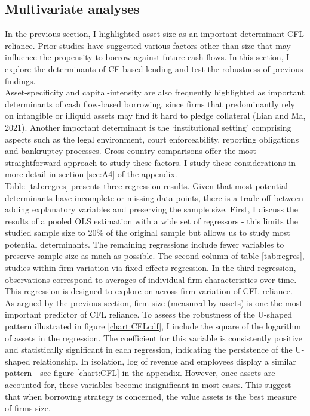 \documentclass[12pt]{article}
\begin{document}
\subsection{Multivariate analyses \label{sec: multivariate analysis}}

In the previous section, I highlighted asset size as an important determinant CFL reliance. Prior studies have suggested various factors other than size that may influence the propensity to borrow against future cash flows. In this section, I explore the determinants of CF-based lending and test the robustness of previous findings. \vspace{3mm} \\
Asset-specificity and capital-intensity are also frequently highlighted as important determinants of cash flow-based borrowing, since firms that predominantly rely on intangible or illiquid assets may find it hard to pledge collateral (Lian and Ma, 2021). Another important determinant is the `institutional setting' comprising aspects such as the legal environment, court enforceability, reporting obligations and bankruptcy processes. Cross-country comparisons offer the most straightforward approach to study these factors. I study these considerations in more detail in section \ref{sec:A4} of the appendix.
 \vspace{3mm} \\
Table \ref{tab:regres} presents three regression results. Given that most potential determinants have incomplete or missing data points, there is a trade-off between adding explanatory variables and preserving the sample size. First, I discuss the results of a pooled OLS estimation with a wide set of regressors - this limits the studied sample size to 20\% of the original sample but allows us to study most potential determinants. The remaining regressions include fewer variables to preserve sample size as much as possible. The second column of table \ref{tab:regres}, studies within firm variation via fixed-effects regression. In the third regression, observations correspond to averages of individual firm characteristics over time. This regression is designed to explore on across-firm variation of CFL reliance. \vspace{3mm} \\
As argued by the previous section, firm size (measured by assets) is one the most important predictor of CFL reliance. To assess the robustness of the U-shaped pattern illustrated in figure \ref{chart:CFLcdf}, I include the square of the logarithm of assets in the regression. The coefficient for this variable is consistently positive and statistically significant in each regression, indicating the persistence of the U-shaped relationship. In isolation, log of revenue and employees display a similar pattern - see figure \ref{chart:CFL} in the appendix. However, once assets are accounted for, these variables become insignificant in most cases. This suggest that when borrowing strategy is concerned, the value assets is the best measure of firms size. \vspace{3mm} \\
\end{document}
